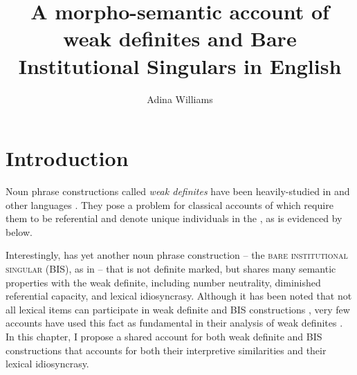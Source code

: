 \documentclass[output=paper,
modfonts
]{langscibook}
\title{A morpho-semantic account of weak definites and Bare Institutional Singulars in English}
\author{%
 Adina Williams\affiliation{New York University}}
\begin{document}
\maketitle

\section{Introduction}\label{sec:williams:1}

Noun phrase constructions called \textit{weak definites} \citep{BirnerWard1994,Poesio1994} have been heavily-studied in  \citep{CarlsonSussman2005,CarlsonEtAlii2006,Aguilar-GuevaraZwarsts2011,Aguilar-Guevara2014} and other languages \citep{Schwarz2009,Schwarz2013,Schwarz2014}. They pose a problem for classical accounts of  \citep{Frege1892,Russell1905,Hawkins1978,Sharvy1980,Heim1982} which require them to be referential and denote unique individuals in the , as is evidenced by  below. 

\begin{exe}
\end{exe}

Interestingly,  has yet another noun phrase construction -- the \textsc{bare institutional singular} (BIS), as in  -- that is not definite marked, but shares many semantic properties with the weak definite, including number neutrality, diminished referential capacity, and lexical idiosyncrasy. Although it has been noted that not all lexical items can participate in weak definite and BIS constructions \citep{Carlson2006b,CarlsonEtAlii2006,Aguilar-GuevaraZwarsts2011,Aguilar-GuevaraEtAlii2014,Aguilar-GuevaraSchulpen2014}, very few accounts have used this fact as fundamental in their analysis of weak definites \citep[but see][]{BaldwinEtAlii2006}. In this chapter, I propose a shared account for both weak definite and BIS constructions that accounts for both their interpretive similarities and their lexical idiosyncrasy. 
\end{document}
